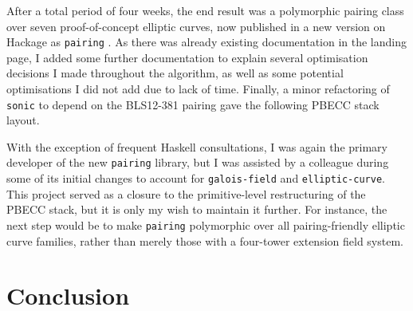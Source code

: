 \documentclass[11pt]{article}
\begin{document}
After a total period of four weeks, the end result was a polymorphic pairing class over seven proof-of-concept elliptic curves, now published in a new version on Hackage as \texttt{pairing} \cite{pairing}. As there was already existing documentation in the landing page, I added some further documentation to explain several optimisation decisions I made throughout the algorithm, as well as some potential optimisations I did not add due to lack of time. Finally, a minor refactoring of \texttt{sonic} to depend on the BLS12-381 pairing gave the following PBECC stack layout.
\begin{center}
\end{center}

With the exception of frequent Haskell consultations, I was again the primary developer of the new \texttt{pairing} library, but I was assisted by a colleague during some of its initial changes to account for \texttt{galois-field} and \texttt{elliptic-curve}. This project served as a closure to the primitive-level restructuring of the PBECC stack, but it is only my wish to maintain it further. For instance, the next step would be to make \texttt{pairing} polymorphic over all pairing-friendly elliptic curve families, rather than merely those with a four-tower extension field system.

\pagebreak

\section{Conclusion}
\end{document}
